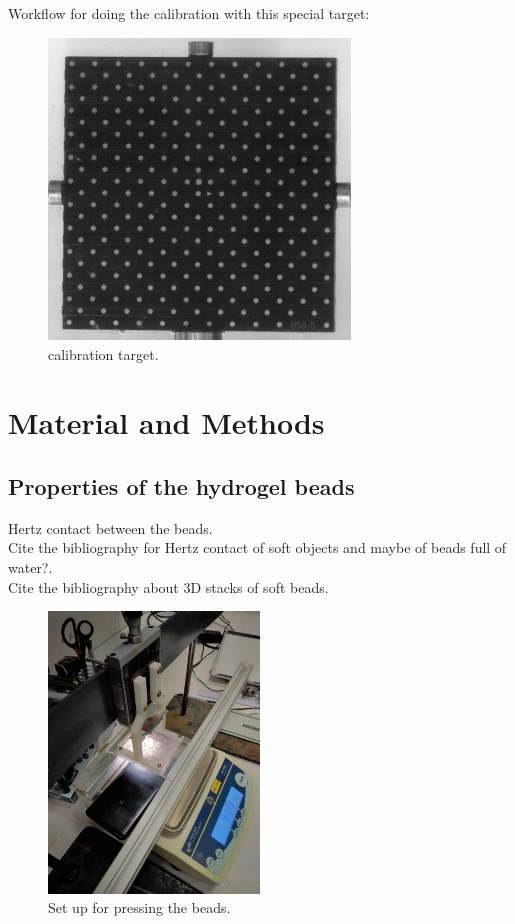 \documentclass[lineno]{jfm}
\begin{document}
Workflow for doing the calibration with this special target: 

\begin{figure}
  \centerline{\includegraphics[height=8cm]{figures/calibrationTarget.png}}
  \caption{calibration target.}
  \label{fig:caltarget}
\end{figure}


\section{Material and Methods}

\subsection{Properties of the hydrogel beads}

Hertz contact between the beads.\\
Cite the bibliography for Hertz contact of soft objects and maybe of beads full of water?.\\
Cite the bibliography about 3D stacks of soft beads.\\

\begin{figure}
  \centerline{\includegraphics[width=0.5\textwidth]{figures/beadsProps_setup.jpg}}%
  \caption{Set up for pressing the beads.}
\label{fig:beadsPress_setup} 
\end{figure}
\end{document}
